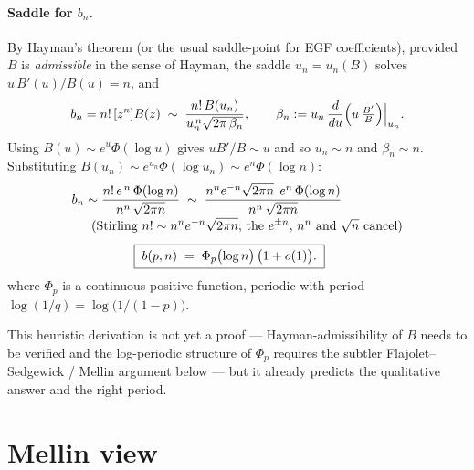 \documentclass[11pt]{article}
\theoremstyle{definition}
\begin{document}
\paragraph{Saddle for $b_n$.} By Hayman's theorem (or the usual
saddle-point for EGF coefficients), provided $B$ is \emph{admissible} in
the sense of Hayman, the saddle $u_n=u_n(B)$ solves
$u\,B'(u)/B(u)=n$, and
\begin{equation}\label{eq:hay}
  b_n = n!\,[z^n]B(z) \;\sim\; \frac{n!\,B(u_n)}{u_n^{\,n}\sqrt{2\pi\,\beta_n}},
  \qquad \beta_n := u_n\,\frac{d}{du}\Bigl(u\,\tfrac{B'}{B}\Bigr)\Big|_{u_n}.
\end{equation}
Using $B(u)\sim e^{u}\Phi(\log u)$ gives $u B'/B\sim u$ and so
$u_n\sim n$ and $\beta_n\sim n$. Substituting
$B(u_n)\sim e^{u_n}\Phi(\log u_n)\sim e^{n}\Phi(\log n)$:
\begin{align*}
  b_n &\sim \frac{n!\,e^{\,n}\,\Phi(\log n)}{n^n\,\sqrt{2\pi n}}
       \;\sim\; \frac{n^n e^{-n}\sqrt{2\pi n}\;\,e^n\,\Phi(\log n)}
                     {n^n\,\sqrt{2\pi n}} \\[-0.2em]
  &\mkern10mu \textrm{(Stirling $n!\sim n^ne^{-n}\sqrt{2\pi n}$; the
    $e^{\pm n}$, $n^n$ and $\sqrt{n}$ cancel)}\\[0.4em]
  &\mkern70mu \boxed{\;b(p,n) \;=\; \Phi_p\bigl(\log n\bigr)\,\bigl(1+o(1)\bigr).\;}
\end{align*}
where $\Phi_p$ is a continuous positive function, periodic with period
$\log(1/q)=\log\bigl(1/(1-p)\bigr)$.

This heuristic derivation is not yet a proof --- Hayman-admissibility
of $B$ needs to be verified and the log-periodic structure of
$\Phi_p$ requires the subtler Flajolet--Sedgewick / Mellin argument
below --- but it already predicts the qualitative answer and the
right period.

\section{Mellin view}\label{sec:mellin}
\end{document}
